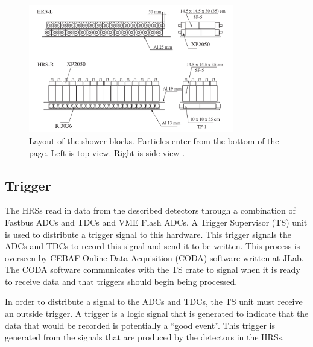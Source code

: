 \begin{figure}
\begin{center}
	\includegraphics[width=0.8\textwidth]{./setup/fig/shower_layout.png}
	\caption{Layout of the shower blocks. Particles enter from the bottom of the page. Left is top-view. Right is side-view \cite{HANIM}.}
	\label{shower_layout}
\end{center}
\end{figure}

\subsection{Trigger}

The HRSs read in data from the described detectors through a combination of Fastbus ADCs and TDCs and VME Flash ADCs. A Trigger Supervisor (TS) unit is used to distribute a trigger signal to this hardware. This trigger signals the ADCs and TDCs to record this signal and send it to be written. This process is overseen by CEBAF Online Data Acquisition (CODA) software written at JLab. The CODA software communicates with the TS crate to signal when it is ready to receive data and that triggers should begin being processed.

In order to distribute a signal to the ADCs and TDCs, the TS unit must receive an outside trigger. A trigger is a logic signal that is generated to indicate that the data that would be recorded is potentially a ``good event''. This trigger is generated from the signals that are produced by the detectors in the HRSs.

